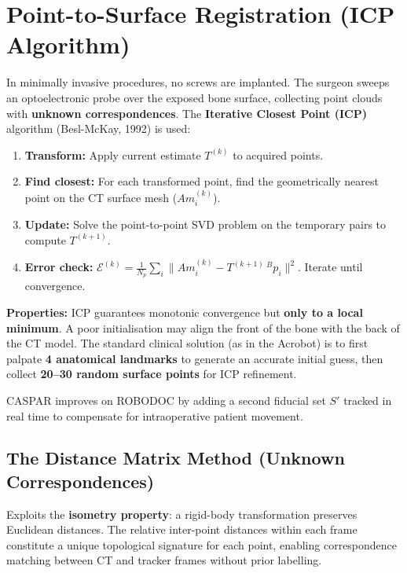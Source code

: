 \documentclass[11pt,a4paper,twoside]{report}
\begin{document}
\section{Point-to-Surface Registration (ICP Algorithm)}
In minimally invasive procedures, no screws are implanted. The surgeon sweeps an optoelectronic probe over the exposed bone surface, collecting point clouds with \textbf{unknown correspondences}. The \textbf{Iterative Closest Point (ICP)} algorithm (Besl-McKay, 1992) is used:

\begin{enumerate}
    \item \textbf{Transform:} Apply current estimate $T^{(k)}$ to acquired points.
    \item \textbf{Find closest:} For each transformed point, find the geometrically nearest point on the CT surface mesh ($A m_i^{(k)}$).
    \item \textbf{Update:} Solve the point-to-point SVD problem on the temporary pairs to compute $T^{(k+1)}$.
    \item \textbf{Error check:} $\mathcal{E}^{(k)} = \frac{1}{N_p}\sum_i \|Am_i^{(k)} - T^{(k+1)}\,{}^Bp_i\|^2$. Iterate until convergence.
\end{enumerate}

\textbf{Properties:} ICP guarantees monotonic convergence but \textbf{only to a local minimum}. A poor initialisation may align the front of the bone with the back of the CT model. The standard clinical solution (as in the Acrobot) is to first palpate \textbf{4 anatomical landmarks} to generate an accurate initial guess, then collect \textbf{20--30 random surface points} for ICP refinement.

CASPAR improves on ROBODOC by adding a second fiducial set $S'$ tracked in real time to compensate for intraoperative patient movement.

\subsection{The Distance Matrix Method (Unknown Correspondences)}
Exploits the \textbf{isometry property}: a rigid-body transformation preserves Euclidean distances. The relative inter-point distances within each frame constitute a unique topological signature for each point, enabling correspondence matching between CT and tracker frames without prior labelling.
\end{document}
